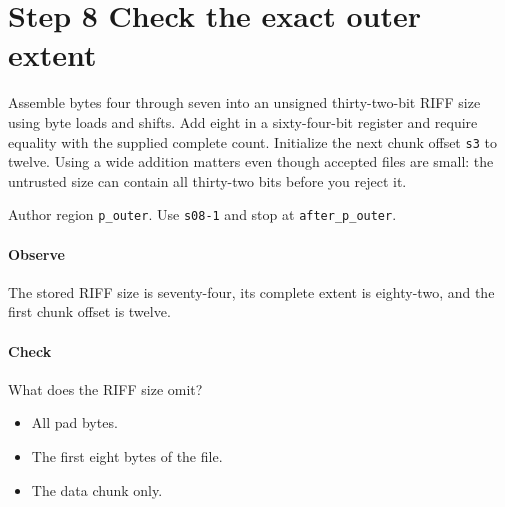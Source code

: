 \section{Step 8 Check the exact outer extent}\label{pcm-wav-s08}
Assemble bytes four through seven into an unsigned thirty-two-bit RIFF size using byte loads and shifts. Add eight in a sixty-four-bit register and require equality with the supplied complete count. Initialize the next chunk offset \texttt{s3} to twelve. Using a wide addition matters even though accepted files are small: the untrusted size can contain all thirty-two bits before you reject it.

Author region \texttt{p\_outer}. Use \texttt{s08-1} and stop at \texttt{after\_p\_outer}.

\paragraph{Observe} The stored RIFF size is seventy-four, its complete extent is eighty-two, and the first chunk offset is twelve.

\paragraph{Check} What does the RIFF size omit?
\begin{itemize}
  \item[A.] All pad bytes.
  \item[B.] The first eight bytes of the file.
  \item[C.] The data chunk only.
\end{itemize}
